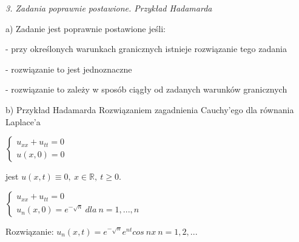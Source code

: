 \textit{3. Zadania poprawnie postawione. Przykład Hadamarda}

a) Zadanie jest poprawnie postawione jeśli:

  - przy określonych warunkach granicznych istnieje rozwiązanie tego zadania
  
  - rozwiązanie to jest jednoznaczne

  - rozwiązanie to zależy w sposób ciągły od zadanych warunków granicznych

b) Przykład Hadamarda
Rozwiązaniem zagadnienia Cauchy'ego dla równania Laplace'a

$\left\{\begin{matrix} u_{xx} + u_{tt} = 0 \\ u(x,0) = 0 \end{matrix}\right.$

jest $u(x,t) \equiv 0,\ x \in \mathbb{R},\ t \geqslant 0$.

$\left\{\begin{matrix} u_{xx} + u_{tt} = 0 \\ u_n(x,0) = e^{-\sqrt{n}}\ dla\ n = 1, ..., n \end{matrix}\right.$

Rozwiązanie: $u_n(x,t) = e^{-\sqrt{n}}e^{nt}cos\ nx\  n = 1, 2, ...$


